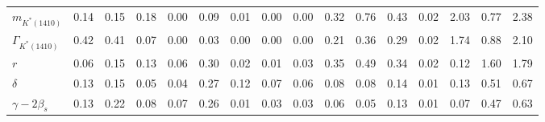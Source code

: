 \begin{tabular}{l  c  c  c  c  c  c  c  c  c  c  c  c  c  c  | c }
$m_{K^{*}(1410)}$ & 0.14 & 0.15 & 0.18 & 0.00 & 0.09 & 0.01 & 0.00 & 0.00 & 0.32 & 0.76 & 0.43 & 0.02 & 2.03 & 0.77 & 2.38 \\ 
$\Gamma_{K^{*}(1410)}$ & 0.42 & 0.41 & 0.07 & 0.00 & 0.03 & 0.00 & 0.00 & 0.00 & 0.21 & 0.36 & 0.29 & 0.02 & 1.74 & 0.88 & 2.10 \\ 
$r$ & 0.06 & 0.15 & 0.13 & 0.06 & 0.30 & 0.02 & 0.01 & 0.03 & 0.35 & 0.49 & 0.34 & 0.02 & 0.12 & 1.60 & 1.79 \\ 
$\delta$ & 0.13 & 0.15 & 0.05 & 0.04 & 0.27 & 0.12 & 0.07 & 0.06 & 0.08 & 0.08 & 0.14 & 0.01 & 0.13 & 0.51 & 0.67 \\ 
$\gamma - 2 \beta_{s}$ & 0.13 & 0.22 & 0.08 & 0.07 & 0.26 & 0.01 & 0.03 & 0.03 & 0.06 & 0.05 & 0.13 & 0.01 & 0.07 & 0.47 & 0.63 \\ 
\hline
\hline
\end{tabular}

